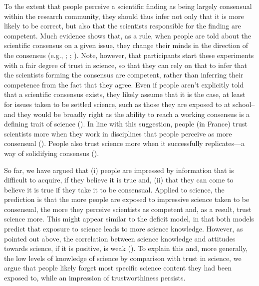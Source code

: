 \documentclass[
  jou,
  floatsintext,
  longtable,
  nolmodern,
  notxfonts,
  notimes,
  colorlinks=true,linkcolor=blue,citecolor=blue,urlcolor=blue]{apa7}
\begin{document}
To the extent that people perceive a scientific finding as being largely
consensual within the research community, they should thus infer not
only that it is more likely to be correct, but also that the scientists
responsible for the finding are competent. Much evidence shows that, as
a rule, when people are told about the scientific consensus on a given
issue, they change their minds in the direction of the consensus (e.g.,
;
;
). Note, however, that participants start these experiments with a
fair degree of trust in science, so that they can rely on that to infer
that the scientists forming the consensus are competent, rather than
inferring their competence from the fact that they agree. Even if people
aren't explicitly told that a scientific consensus exists, they likely
assume that it is the case, at least for issues taken to be settled
science, such as those they are exposed to at school--and they would be
broadly right as the ability to reach a working consensus is a defining
trait of science
().
In line with this suggestion, people (in France) trust scientists more
when they work in disciplines that people perceive as more consensual
().
People also trust science more when it successfully replicates---a way
of solidifying consensus
().

So far, we have argued that (i) people are impressed by information that
is difficult to acquire, if they believe it is true and, (ii) that they
can come to believe it is true if they take it to be consensual. Applied
to science, the prediction is that the more people are exposed to
impressive science taken to be consensual, the more they perceive
scientists as competent and, as a result, trust science more. This might
appear similar to the deficit model, in that both models predict that
exposure to science leads to more science knowledge. However, as pointed
out above, the correlation between science knowledge and attitudes
towards science, if it is positive, is weak
().
To explain this and, more generally, the low levels of knowledge of
science by comparison with trust in science, we argue that people likely
forget most specific science content they had been exposed to, while an
impression of trustworthiness persists.
\end{document}
